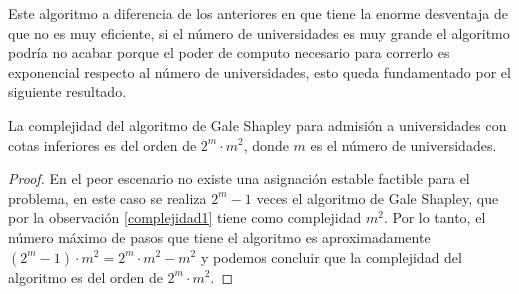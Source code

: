 Este algoritmo a diferencia de los anteriores en que tiene la enorme desventaja de que no es muy eficiente, si el número de universidades es muy grande el algoritmo podría no acabar porque el poder de computo necesario para correrlo es exponencial respecto al número de universidades, esto queda fundamentado por el siguiente resultado.
\begin{cor}
La complejidad del algoritmo de Gale Shapley para admisión a universidades con cotas inferiores es del orden de $2^{m}\cdot m^2$, donde $m$ es el número de universidades.
\end{cor}
\begin{proof}
En el peor escenario no existe una asignación estable factible para el problema, en este caso se realiza $2^{m}-1$ veces el algoritmo de Gale Shapley, que por la observación \ref{complejidad1} tiene como complejidad $m^2$. Por lo tanto, el número máximo de pasos que tiene el algoritmo es aproximadamente $(2^{m}-1)\cdot m^2=2^{m}\cdot m^2-m^2$ y podemos concluir que la complejidad del algoritmo es del orden de $2^{m}\cdot m^2$.
\end{proof}

